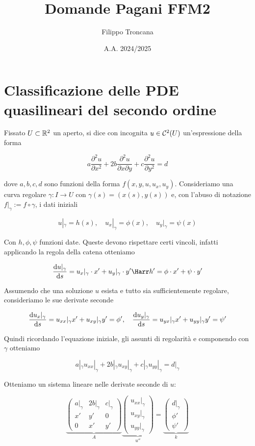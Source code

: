 \documentclass{article}
\title{Domande Pagani FFM2}
\author{Filippo Troncana}
\date{A.A. 2024/2025}
\renewcommand\C{\mc{C}}
\newcommand\del{\partial}
\begin{document}
\maketitle

\tableofcontents

\section{Classificazione delle PDE quasilineari del secondo ordine}

Fissato $U \subset \mathbb{R}^2$ un aperto, si dice  con incognita $u \in \C^2(U)$ un'espressione della forma 

\[ a\frac{\del^2 u}{\del x^2} + 2b\frac{\del^2 u}{\del x\del y} + c\frac{\del^2 u}{\del y^2} = d\]

dove $a,b,c,d$ sono funzioni della forma $f(x,y,u,u_x,u_y)$. Consideriamo una curva regolare $\gamma : I \to U$ con $\gamma(s) = (x(s), y(s))$ e, con l'abuso di notazione $f|_\gamma := f \circ \gamma$, i dati iniziali 

\[ u|_\gamma = h(s), \quad u_x|_\gamma  = \phi(x), \quad u_y|_\gamma = \psi(x)\]

Con $h,\phi,\psi$ funzioni date. Queste devono rispettare certi vincoli, infatti applicando la regola della catena otteniamo

\[ \frac{\di u|_\gamma}{\di s}= u_x|_\gamma \cdot x'+ u_y|_\gamma \cdot y' \Harr h' = \phi\cdot x' + \psi\cdot y' \]

Assumendo che una soluzione $u$ esista e tutto sia sufficientemente regolare, consideriamo le sue derivate seconde

\[ \frac{\text{d} u_x|_\gamma}{\text{d} s} = u_{xx}|_\gamma x' + u_{xy}|_\gamma y'=\phi',\quad \frac{\text{d} u_y|_\gamma}{\text{d} s} = u_{yx}|_\gamma x' + u_{yy}|_\gamma y'=\psi'\]

Quindi ricordando l'equazione iniziale, gli assunti di regolarità e componendo con $\gamma$ otteniamo

\[ a|_\gamma u_{xx}|_\gamma + 2b|_\gamma u_{xy}|_\gamma + c|_\gamma u_{yy}|_\gamma = d|_\gamma\]

Otteniamo un sistema lineare nelle derivate seconde di $u$:

\[\underbrace{\begin{pmatrix} a|_\gamma & 2b|_\gamma & c|_\gamma \\ x' & y' & 0 \\ 0 & x' & y' \end{pmatrix}}_{A} \underbrace{\begin{pmatrix} u_{xx}|_\gamma \\ u_{xy}|_\gamma \\ u_{yy}|_\gamma \end{pmatrix}}_{u''} = \underbrace{\begin{pmatrix} d|_\gamma \\ \phi' \\ \psi' \end{pmatrix}}_{k} \]
\end{document}
